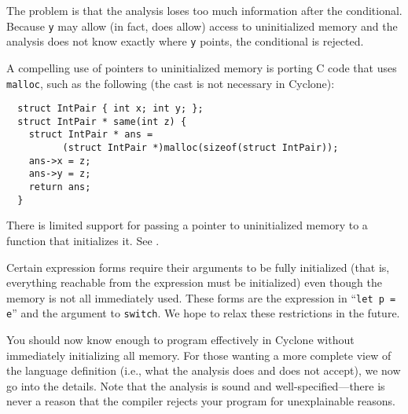 The problem is that the analysis loses too much information after the
conditional.  Because \texttt{y} may allow (in fact, does allow)
access to uninitialized memory and the analysis does not know exactly
where \texttt{y} points, the conditional is rejected.

A compelling use of pointers to uninitialized memory is porting C code
that uses \texttt{malloc}, such as the following (the cast is not
necessary in Cyclone):
\begin{verbatim}
  struct IntPair { int x; int y; };
  struct IntPair * same(int z) {
    struct IntPair * ans = 
          (struct IntPair *)malloc(sizeof(struct IntPair));
    ans->x = z;
    ans->y = z;
    return ans;
  }
\end{verbatim}

There is limited support for passing a pointer to uninitialized memory
to a function that initializes it.  See .

Certain expression forms require their arguments to be fully
initialized (that is, everything reachable from the expression must be
initialized) even though the memory is not all immediately used.
These forms are the expression in ``\texttt{let p = e}'' and the
argument to \texttt{switch}.  We hope to relax these restrictions in
the future.

You should now know enough to program effectively in Cyclone without
immediately initializing all memory.  For those wanting a more
complete view of the language definition (i.e., what the analysis does
and does not accept), we now go into the details.  Note that the
analysis is sound and well-specified---there is never a reason that
the compiler rejects your program for unexplainable reasons.

